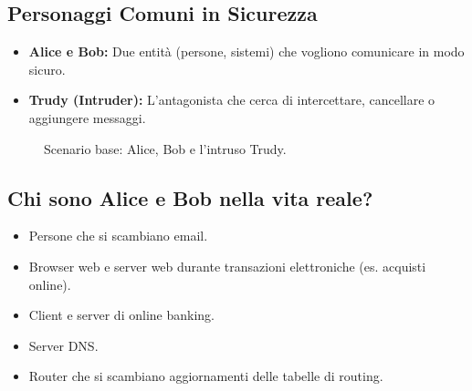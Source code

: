 \subsection{Personaggi Comuni in Sicurezza}
\begin{itemize}
    \item \textbf{Alice e Bob:} Due entità (persone, sistemi) che vogliono comunicare in modo sicuro.
    \item \textbf{Trudy (Intruder):} L'antagonista che cerca di intercettare, cancellare o aggiungere messaggi.
\end{itemize}

\begin{figure}[H]
    \centering
    \caption{Scenario base: Alice, Bob e l'intruso Trudy.}
\end{figure}

\subsection{Chi sono Alice e Bob nella vita reale?}
\begin{itemize}
    \item Persone che si scambiano email.
    \item Browser web e server web durante transazioni elettroniche (es. acquisti online).
    \item Client e server di online banking.
    \item Server DNS.
    \item Router che si scambiano aggiornamenti delle tabelle di routing.
\end{itemize}

